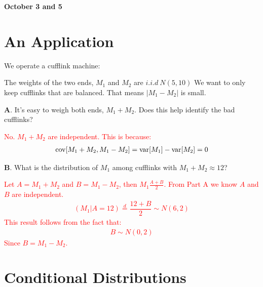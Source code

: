 \documentclass[../../../Master/AppliedStochastics.tex]{subfiles}
\author{Chandler}  %
\date{October 3}    %
\begin{document}
%


\makelecture %
\textbf{October 3 and 5}
\section{An Application}

We operate a cufflink machine:

\begin{center}
\end{center}

The weights of the two ends, $M_1$ and $M_2$ are $i.i.d\ N(5,10)$ 
We want to only keep cufflinks that are balanced. 
That means $\lvert M_{1} - M_{2} \rvert$ is small.

\textbf{A}. It's easy to weigh both ends, $M_{1}+M_{2}$. 
Does this help identify the bad cufflinks?

\textcolor{Red}{No. $M_{1}+M_{2}$ are independent. 
	This is because: 
	$$\begin{aligned}
	\operatorname{cov} [M_{1}+M_{2}, M_{1}-M_{2}] = \operatorname{var} [M_{1}]-\operatorname{var} [M_{2}] = 0
	\end{aligned}$$ }

\textbf{B}. What is the distribution of $M_{1}$ among cufflinks with $M_{1}+M_{2}\approx 12$? 

\textcolor{Red}{Let $A=M_{1}+M_{2}$ and $B=M_{1}-M_{2}$, then $M_{1}\frac{A+B}{2}$. 
From Part A we know $A$ and $B$ are independent. 
	$$\begin{aligned}
	(M_{1}\vert A=12) \stackrel{d}{=} \dfrac{12 + B}{2} \sim N(6,2)
	\end{aligned}$$
This result follows from the fact that: 
	$$\begin{aligned}
	B \sim N(0,2)
	\end{aligned}$$ 
Since $B=M_{1}-M_{2}$.
}


\section{Conditional Distributions}
\end{document}
